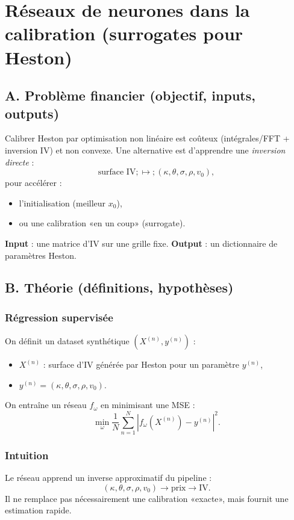 \documentclass[11pt,a4paper]{report}
\theoremstyle{definition}
\theoremstyle{plain}
\theoremstyle{remark}
\newcommand{\1}{\mathbf{1}}
\begin{document}
\chapter{Réseaux de neurones dans la calibration (surrogates pour Heston)}

\section{A. Problème financier (objectif, inputs, outputs)}
Calibrer Heston par optimisation non linéaire est coûteux (intégrales/FFT + inversion IV) et non convexe. Une alternative est d'apprendre une \emph{inversion directe} :
\[
\text{surface IV} ;\mapsto; (\kappa,\theta,\sigma,\rho,v_0),
\]
pour accélérer :
\begin{itemize}[leftmargin=*]
\item l'initialisation (meilleur $x_0$),
\item ou une calibration «en un coup» (surrogate).
\end{itemize}

\textbf{Input} : une matrice d'IV sur une grille fixe.
\textbf{Output} : un dictionnaire de paramètres Heston.

\section{B. Théorie (définitions, hypothèses)}
\subsection*{Régression supervisée}
On définit un dataset synthétique ${(X^{(n)},y^{(n)})}$ :
\begin{itemize}[leftmargin=*]
\item $X^{(n)}$ : surface d'IV générée par Heston pour un paramètre $y^{(n)}$,
\item $y^{(n)}=(\kappa,\theta,\sigma,\rho,v_0)$.
\end{itemize}
On entraîne un réseau $f_\omega$ en minimisant une MSE :
\[
\min_\omega \frac1N\sum_{n=1}^N |f_\omega(X^{(n)})-y^{(n)}|^2.
\]

\subsection*{Intuition}
Le réseau apprend un inverse approximatif du pipeline :
\[
(\kappa,\theta,\sigma,\rho,v_0)\to \text{prix}\to \text{IV}.
\]
Il ne remplace pas nécessairement une calibration «exacte», mais fournit une estimation rapide.
\end{document}
